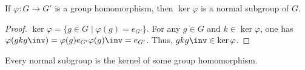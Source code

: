 \documentclass{amsart}
\begin{document}
\begin{lem}
  If $\varphi : G \to G'$ is a group homomorphism, then $\ker{\varphi}$ is a normal subgroup of $G$.
\end{lem}
\begin{proof}
  $\ker{\varphi} = \{g \in G \mid \varphi(g) = e_{G'}\}$.
  For any $g \in G$ and $k \in \ker{\varphi}$, one has $\varphi(gkg\inv) = \varphi(g)e_{G'}\varphi(g)\inv = e_{G'}$.
  Thus, $gkg\inv \in \ker{\varphi}$.
\end{proof}


\begin{lem}
  Every normal subgroup is the kernel of some group homomorphism.
\end{lem}
\end{document}
